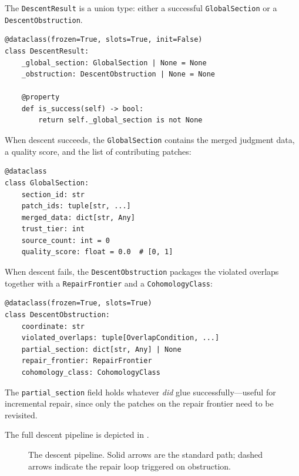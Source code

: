 \documentclass[11pt]{article}
\begin{document}
The \texttt{DescentResult} is a union type: either a successful
\texttt{GlobalSection} or a \texttt{DescentObstruction}.

\begin{lstlisting}[caption={Descent result (simplified).},label={lst:descent-result}]
@dataclass(frozen=True, slots=True, init=False)
class DescentResult:
    _global_section: GlobalSection | None = None
    _obstruction: DescentObstruction | None = None

    @property
    def is_success(self) -> bool:
        return self._global_section is not None
\end{lstlisting}

When descent succeeds, the \texttt{GlobalSection} contains the merged
judgment data, a quality score, and the list of contributing patches:

\begin{lstlisting}[caption={Global section (simplified).},label={lst:global-section}]
@dataclass
class GlobalSection:
    section_id: str
    patch_ids: tuple[str, ...]
    merged_data: dict[str, Any]
    trust_tier: int
    source_count: int = 0
    quality_score: float = 0.0  # [0, 1]
\end{lstlisting}

When descent fails, the \texttt{DescentObstruction} packages the violated
overlaps together with a \texttt{RepairFrontier} and a
\texttt{CohomologyClass}:

\begin{lstlisting}[caption={Descent obstruction (simplified).},label={lst:descent-obst}]
@dataclass(frozen=True, slots=True)
class DescentObstruction:
    coordinate: str
    violated_overlaps: tuple[OverlapCondition, ...]
    partial_section: dict[str, Any] | None
    repair_frontier: RepairFrontier
    cohomology_class: CohomologyClass
\end{lstlisting}

\noindent
The \texttt{partial\_section} field holds whatever \emph{did} glue
successfully---useful for incremental repair, since only the patches on
the repair frontier need to be revisited.

The full descent pipeline is depicted in .

\begin{figure}[ht]
\centering
{}
\caption{The descent pipeline.  Solid arrows are the standard path; dashed
arrows indicate the repair loop triggered on obstruction.}
\label{fig:descent-pipeline}
\end{figure}
\end{document}
